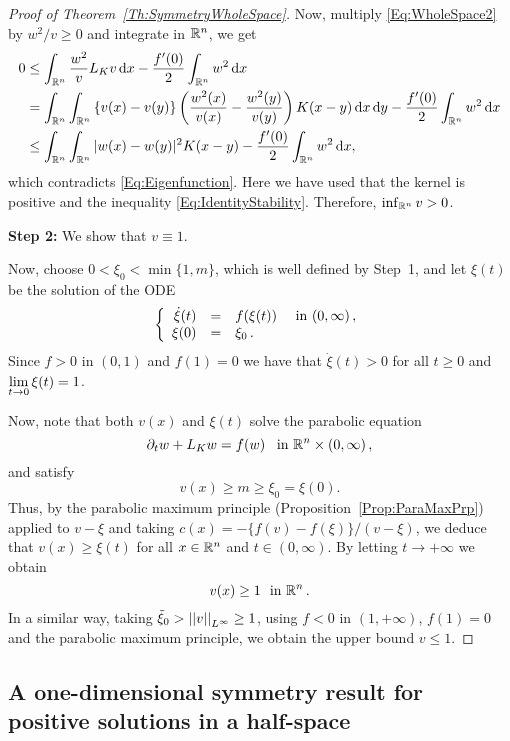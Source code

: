 \begin{proof}[Proof of Theorem~\ref{Th:SymmetryWholeSpace}]
Now, multiply \eqref{Eq:WholeSpace2} by $w^2/v\geq 0$ and integrate in $\mathbb{R}^n$, we get
\begin{align*}
0 &\leq \int_{\mathbb{R}^n} \frac{w^2}{v}  L_K v \,\mathrm{d} x - \frac{f'(0)}{2}\int_{\mathbb{R}^n} w^2 \,\mathrm{d} x \\
&= \int_{\mathbb{R}^n}\int_{\mathbb{R}^n}\left\{ v(x)-v(y) \right\} \left( \frac{w^2(x)}{v(x)}-\frac{w^2(y)}{v(y)} \right) K(x-y) \,\mathrm{d} x \,\mathrm{d} y - \frac{f'(0)}{2}\int_{\mathbb{R}^n} w^2 \,\mathrm{d} x \\
&\leq \int_{\mathbb{R}^n}\int_{\mathbb{R}^n} |w(x)-w(y)|^2 K(x-y) - \frac{f'(0)}{2}\int_{\mathbb{R}^n} w^2 \,\mathrm{d} x ,
\end{align*}
which contradicts \eqref{Eq:Eigenfunction}. Here we have used that the kernel is positive and the inequality \eqref{Eq:IdentityStability}. Therefore, $\inf_{\mathbb{R}^n} v >0$.

\textbf{Step 2:} We show that $v\equiv 1$.

Now, choose $0<\xi_0<\min\{1,m\}$, which is well defined by Step~1, and let $\xi(t)$ be the solution of the ODE
$$
\left\{\begin{array}{rcll}
\dot{\xi}(t) &=& f(\xi(t)) & \textrm{ in }(0,\infty)\,,\\
\xi(0) &=& \xi_0\,.
\end{array} \right.
$$
Since $f>0$ in $(0,1)$ and $f(1) = 0$ we have that $\dot{\xi}(t)>0$ for all $t\geq 0$ and $\displaystyle \lim_{t\to 0} \xi(t) = 1$.

Now, note that both $v(x)$ and $\xi(t)$ solve the parabolic equation
$$ \partial_t w + L_K w = f(w) \,\,\, \textrm{ in }\mathbb{R}^n\times (0,\infty)\,, $$
and satisfy
$$ v(x) \geq m \geq \xi_0 = \xi(0). $$
Thus, by the parabolic maximum principle (Proposition~\ref{Prop:ParaMaxPrp}) applied to $v-\xi$ and taking $c(x) = -\{f(v)-f(\xi)\}/(v-\xi)$, we deduce that $v(x)\geq \xi(t)$ for all $x\in\mathbb{R}^n$ and $t\in(0,\infty)$. By letting $t \to +\infty$ we obtain
$$
 v(x) \geq 1 \,\, \textrm{ in }\mathbb{R}^n\,.  
$$
In a similar way, taking $\tilde{\xi}_0>\left | \left |{v} \right | \right |_{L^\infty} \geq 1$, using $f<0$ in $(1,+\infty)$, $f(1)=0$ and the parabolic maximum principle, we obtain the upper bound $v\leq 1$.

\end{proof}



\subsection{A one-dimensional symmetry result for positive solutions in a half-space}

